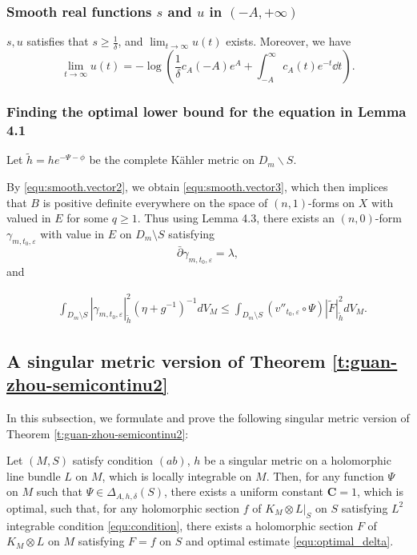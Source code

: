 \subsubsection{Smooth real functions \texorpdfstring{$s$}{} and \texorpdfstring{$u$}{} in \texorpdfstring{$(-A,+\infty)$}{}}
$s,u$ satisfies that $s\geqslant \frac{1}{\delta}$, and $\lim_{t\to\infty} u(t)$ exists. Moreover, we have
\[
  \lim_{t\to\infty} u(t)=-\log(\frac{1}{\delta}c_{A}(-A)e^{A}+\int_{-A}^{\infty}c_{A}(t)e^{-t}\dd t).
\]

\subsubsection{Finding the optimal lower bound for the equation in Lemma 4.1}

Let $\tilde{h}=he^{-\Psi-\phi}$ be the complete K\"ahler metric on $D_m\backslash S$.

By \eqref{equ:smooth.vector2}, we obtain \eqref{equ:smooth.vector3}, which then implices that $B$ is positive definite everywhere on the space of $(n,1)$-forms on $X$  with valued in $E$ for some $q\geqslant 1$. Thus using Lemma 4.3, there exists an $(n,0)$-form
$\gamma_{m,t_0,\varepsilon}$ with value in $E$ on $D_{m}\setminus S$
satisfying
$$\bar{\partial}\gamma_{m,t_0,\varepsilon}=\lambda,$$
and

\begin{equation*}
 \begin{split}
 &\int_{ D_m\setminus S}|\gamma_{m,t_0,\varepsilon}|^{2}_{\tilde{h}}(\eta+g^{-1})^{-1}dV_{M}
  \leq\int_{D_m\setminus S}(v''_{t_0,\varepsilon}\circ{\Psi})| \tilde{F}|^2_{\tilde{h}}dV_M.
  \end{split}
\end{equation*}












\subsection{A singular metric version of Theorem \ref{t:guan-zhou-semicontinu2}}

In this subsection, we formulate and prove the following singular
metric version of Theorem \ref{t:guan-zhou-semicontinu2}:

\begin{theorem}
Let $(M,S)$ satisfy condition $(ab)$, $h$ be a singular metric on a
holomorphic line bundle $L$ on $M$, which is locally integrable on
$M$. Then, for any function $\Psi$ on $ M$ such that $\Psi\in
\Delta_{A,h,\delta}(S)$, there exists a uniform constant
$\mathbf{C}=1$, which is optimal, such that, for any holomorphic
section $f$ of $K_{M}\otimes L|_{S}$ on $S$ satisfying $L^2$
integrable condition \ref{equ:condition}, there exists a holomorphic
section $F$ of $K_{M}\otimes L$ on $M$ satisfying $F = f$ on $ S$
and optimal estimate \ref{equ:optimal_delta}.
\end{theorem}

